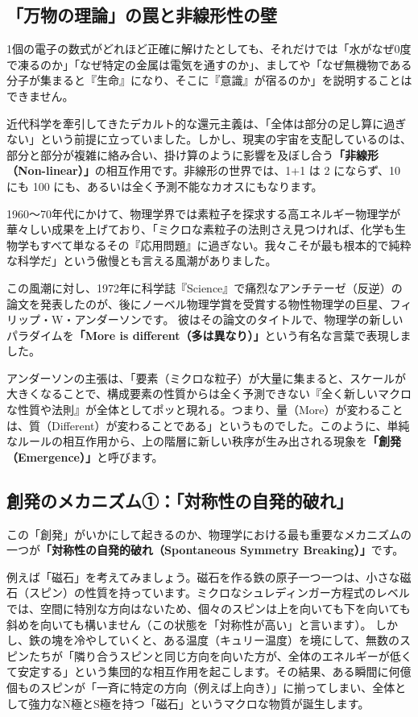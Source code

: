 \subsection{「万物の理論」の罠と非線形性の壁}

1個の電子の数式がどれほど正確に解けたとしても、それだけでは「水がなぜ0度で凍るのか」「なぜ特定の金属は電気を通すのか」、ましてや「なぜ無機物である分子が集まると『生命』になり、そこに『意識』が宿るのか」を説明することはできません。

近代科学を牽引してきたデカルト的な還元主義は、「全体は部分の足し算に過ぎない」という前提に立っていました。しかし、現実の宇宙を支配しているのは、部分と部分が複雑に絡み合い、掛け算のように影響を及ぼし合う\textbf{「非線形（Non-linear）」}の相互作用です。非線形の世界では、1+1 は 2 にならず、10 にも 100 にも、あるいは全く予測不能なカオスにもなります。

1960〜70年代にかけて、物理学界では素粒子を探求する高エネルギー物理学が華々しい成果を上げており、「ミクロな素粒子の法則さえ見つければ、化学も生物学もすべて単なるその『応用問題』に過ぎない。我々こそが最も根本的で純粋な科学だ」という傲慢とも言える風潮がありました。

この風潮に対し、1972年に科学誌『Science』で痛烈なアンチテーゼ（反逆）の論文を発表したのが、後にノーベル物理学賞を受賞する物性物理学の巨星、フィリップ・W・アンダーソンです。 彼はその論文のタイトルで、物理学の新しいパラダイムを\textbf{「More is different（多は異なり）」}という有名な言葉で表現しました。

アンダーソンの主張は、「要素（ミクロな粒子）が大量に集まると、スケールが大きくなることで、構成要素の性質からは全く予測できない『全く新しいマクロな性質や法則』が全体としてポッと現れる。つまり、量（More）が変わることは、質（Different）が変わることである」というものでした。このように、単純なルールの相互作用から、上の階層に新しい秩序が生み出される現象を\textbf{「創発（Emergence）」}と呼びます。

\subsection{創発のメカニズム①：「対称性の自発的破れ」}

この「創発」がいかにして起きるのか、物理学における最も重要なメカニズムの一つが\textbf{「対称性の自発的破れ（Spontaneous Symmetry Breaking）」}です。

例えば「磁石」を考えてみましょう。磁石を作る鉄の原子一つ一つは、小さな磁石（スピン）の性質を持っています。ミクロなシュレディンガー方程式のレベルでは、空間に特別な方向はないため、個々のスピンは上を向いても下を向いても斜めを向いても構いません（この状態を「対称性が高い」と言います）。 しかし、鉄の塊を冷やしていくと、ある温度（キュリー温度）を境にして、無数のスピンたちが「隣り合うスピンと同じ方向を向いた方が、全体のエネルギーが低くて安定する」という集団的な相互作用を起こします。その結果、ある瞬間に何億個ものスピンが「一斉に特定の方向（例えば上向き）」に揃ってしまい、全体として強力なN極とS極を持つ「磁石」というマクロな物質が誕生します。

